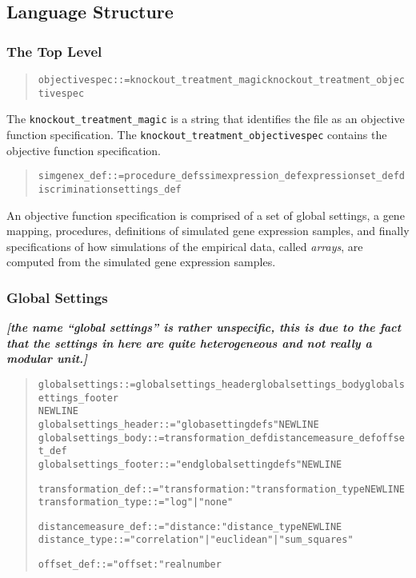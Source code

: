 \documentclass[a4paper,fleqn]{article}
\newcommand{\computercode}[1]{\texttt{#1}}
\newcommand{\newterm}[1]{\emph{#1}}
\newcommand{\todo}[1]{\rule{0pt}{0pt}\marginpar{\rule{1ex}{1ex}}\textbf{\emph{[#1]}}}
\newenvironment{ebnfrule}{\begin{footnotesize}\begin{quote}\begin{alltt}}{\end{alltt}\end{quote}\end{footnotesize}}
\begin{document}
\subsection{Language Structure}

\subsubsection{The Top Level}

\begin{ebnfrule}
objectivespec ::= knockout_treatment_magic knockout_treatment_objectivespec
\end{ebnfrule}
The \computercode{knockout\_treatment\_magic} is a string that
identifies the file as an objective function specification. The
\computercode{knockout\_treatment\_objectivespec} contains the
objective function specification.

\begin{ebnfrule}
simgenex_def ::= procedure_defs simexpression_def expressionset_def discriminationsettings_def
\end{ebnfrule}
An objective function specification is comprised of a set of global
settings, a gene mapping, procedures, definitions of simulated gene
expression samples, and finally specifications of how simulations of
the empirical data, called \newterm{arrays}, are computed from the
simulated gene expression samples.


\subsubsection{Global Settings}

\todo{the name ``global settings'' is rather unspecific, this is due
  to the fact that the settings in here are quite heterogeneous and
  not really a modular unit.}

\begin{ebnfrule}
globalsettings ::= globalsettings_header globalsettings_body globalsettings_footer
NEWLINE
globalsettings_header ::= "globasettingdefs" NEWLINE
globalsettings_body ::= transformation_def distancemeasure_def offset_def
globalsettings_footer ::= "endglobalsettingdefs" NEWLINE

transformation_def ::= "transformation:" transformation_type NEWLINE
transformation_type ::= "log" | "none"

distancemeasure_def ::= "distance:" distance_type NEWLINE
distance_type ::= "correlation" | "euclidean" | "sum_squares" 

offset_def ::= "offset:" realnumber
\end{ebnfrule}
\end{document}
